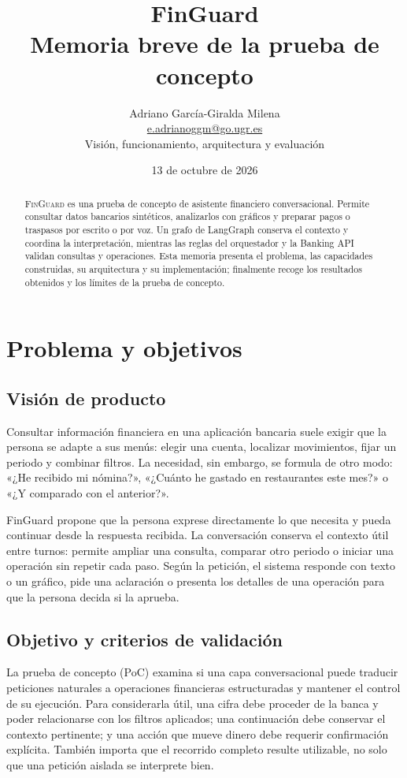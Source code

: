 \documentclass[12pt,a4paper]{article}
\title{\textbf{FinGuard}\\[0.35em]\large Memoria breve de la prueba de concepto}
\author{Adriano García-Giralda Milena\\\href{mailto:e.adrianoggm@go.ugr.es}{e.adrianoggm@go.ugr.es}\\[0.6em]\small Visión, funcionamiento, arquitectura y evaluación}
\date{13 de octubre de 2026}
\newcommand{\FinGuard}{\textsc{FinGuard}}\newcommand{\code}[1]{\texttt{#1}}
\begin{document}
\maketitle
\begin{abstract}
\FinGuard{} es una prueba de concepto de asistente financiero conversacional. Permite consultar datos bancarios sintéticos, analizarlos con gráficos y preparar pagos o traspasos por escrito o por voz. Un grafo de LangGraph conserva el contexto y coordina la interpretación, mientras las reglas del orquestador y la Banking API validan consultas y operaciones. Esta memoria presenta el problema, las capacidades construidas, su arquitectura y su implementación; finalmente recoge los resultados obtenidos y los límites de la prueba de concepto.
\end{abstract}
\newpage
{\small\setlength{\parskip}{0pt}\tableofcontents}
\newpage

\section{Problema y objetivos}

\subsection{Visión de producto}
Consultar información financiera en una aplicación bancaria suele exigir que la persona se adapte a sus menús: elegir una cuenta, localizar movimientos, fijar un periodo y combinar filtros. La necesidad, sin embargo, se formula de otro modo: «¿He recibido mi nómina?», «¿Cuánto he gastado en restaurantes este mes?» o «¿Y comparado con el anterior?».

FinGuard propone que la persona exprese directamente lo que necesita y pueda continuar desde la respuesta recibida. La conversación conserva el contexto útil entre turnos: permite ampliar una consulta, comparar otro periodo o iniciar una operación sin repetir cada paso. Según la petición, el sistema responde con texto o un gráfico, pide una aclaración o presenta los detalles de una operación para que la persona decida si la aprueba.

\subsection{Objetivo y criterios de validación}
La prueba de concepto (PoC) examina si una capa conversacional puede traducir peticiones naturales a operaciones financieras estructuradas y mantener el control de su ejecución. Para considerarla útil, una cifra debe proceder de la banca y poder relacionarse con los filtros aplicados; una continuación debe conservar el contexto pertinente; y una acción que mueve dinero debe requerir confirmación explícita. También importa que el recorrido completo resulte utilizable, no solo que una petición aislada se interprete bien.
\end{document}
